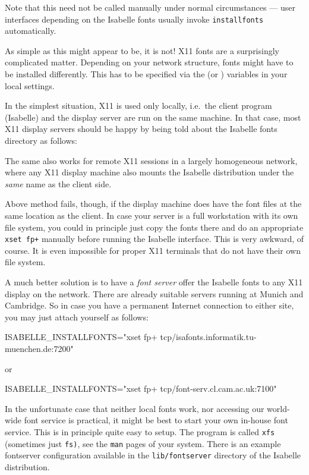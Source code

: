 Note that this need not be called manually under normal circumstances --- user
interfaces depending on the Isabelle fonts usually invoke
\texttt{installfonts} automatically.

\medskip As simple as this might appear to be, it is not! X11 fonts are a
surprisingly complicated matter. Depending on your network structure, fonts
might have to be installed differently. This has to be specified via the
 (or ) variables in
your local settings.

\medskip In the simplest situation, X11 is used only locally, i.e.\ the client
program (Isabelle) and the display server are run on the same machine. In that
case, most X11 display servers should be happy by being told about the
Isabelle fonts directory as follows:
The same also works for remote X11 sessions in a largely homogeneous network,
where any X11 display machine also mounts the Isabelle distribution under the
\emph{same} name as the client side.

\medskip Above method fails, though, if the display machine does have the font
files at the same location as the client. In case your server is a full
workstation with its own file system, you could in principle just copy the
fonts there and do an appropriate \texttt{xset~fp+} manually before running
the Isabelle interface. This is very awkward, of course. It is even impossible
for proper X11 terminals that do not have their own file system.

A much better solution is to have a \emph{font server} offer the Isabelle
fonts to any X11 display on the network.  There are already suitable servers
running at Munich and Cambridge. So in case you have a permanent Internet
connection to either site, you may just attach yourself as follows:
\begin{ttbox}
ISABELLE_INSTALLFONTS="xset fp+ tcp/isafonts.informatik.tu-muenchen.de:7200"
\end{ttbox}
or
\begin{ttbox}
ISABELLE_INSTALLFONTS="xset fp+ tcp/font-serv.cl.cam.ac.uk:7100"
\end{ttbox}

\medskip In the unfortunate case that neither local fonts work, nor accessing
our world-wide font service is practical, it might be best to start your own
in-house font service. This is in principle quite easy to setup. The program
is called \texttt{xfs} (sometimes just \texttt{fs)}, see the \texttt{man}
pages of your system. There is an example fontserver configuration available
in the \texttt{lib/fontserver} directory of the Isabelle distribution.


